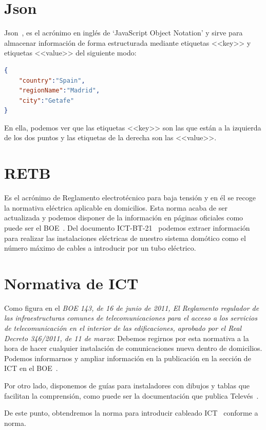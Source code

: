 \section{Json}
{Json~\cite{misc:Json}}, es el acrónimo en inglés de ‘JavaScript Object Notation’ y sirve para almacenar información de forma estructurada mediante etiquetas <<key>> y etiquetas <<value>> del siguiente modo:

\begin{lstlisting}[language=json,firstnumber=1]
{
    "country":"Spain", 
    "regionName":"Madrid", 
    "city":"Getafe"
}
\end{lstlisting}




En ella, podemos ver que las etiquetas <<key>> son las que están a la izquierda de los dos puntos y las etiquetas de la derecha son las <<value>>.

\section{RETB}
Es el acrónimo de Reglamento electrotécnico para baja tensión y en él se recoge la normativa eléctrica aplicable en domicilios.
Esta norma acaba de ser actualizada y podemos disponer de la información en páginas oficiales como puede ser el BOE~\cite{manual:REBT}.
Del documento ICT-BT-21~\cite{manual:ICT-BT-21} podemos extraer información para realizar las instalaciones eléctricas de nuestro sistema domótico como el número máximo de cables a introducir por un tubo eléctrico.

\section{Normativa de ICT}
Como figura en el \textit{BOE 143, de 16 de junio de 2011, El Reglamento regulador de las infraestructuras comunes de telecomunicaciones para el acceso a los servicios de telecomunicación en el interior de las edificaciones, aprobado por el Real Decreto 346/2011, de 11 de marzo}:
Debemos regirnos por esta normativa a la hora de hacer cualquier instalación de comunicaciones nueva dentro de domicilios.
Podemos informarnos y ampliar información en la publicación en la sección de ICT en el BOE~\cite{manual:ICT}.

Por otro lado, disponemos de guías para instaladores con dibujos y tablas que facilitan la comprensión, como puede ser la documentación que publica Televés~\cite{manual:ICT-Televes}.

De este punto, obtendremos la norma para introducir cableado ICT~\cite{manual:ICT} conforme a norma.

